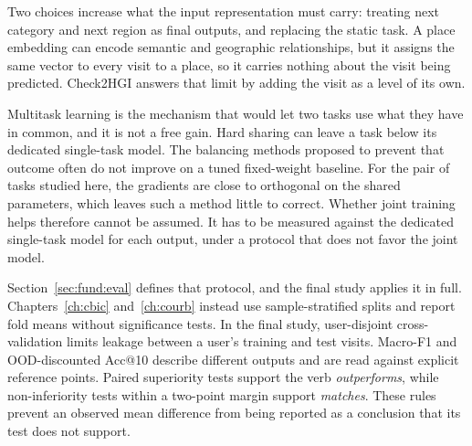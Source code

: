 Two choices increase what the input representation must carry: treating next category
and next region as final outputs, and replacing the static task. A place embedding
can encode semantic and geographic relationships, but it assigns the same vector to
every visit to a place, so it carries nothing about the visit being predicted.
Check2HGI answers that limit by adding the visit as a level of its own.

Multitask learning is the mechanism that would let two tasks use what they have in
common, and it is not a free gain. Hard sharing can leave a task below its dedicated
single-task model. The balancing methods proposed to prevent that outcome often do not
improve on a tuned fixed-weight baseline. For the pair of tasks studied here, the
gradients are close to orthogonal on the shared parameters, which leaves such a method
little to correct. Whether joint training helps therefore cannot be assumed. It has to be
measured against the dedicated single-task model for each output, under a protocol
that does not favor the joint model.

Section~\ref{sec:fund:eval} defines that protocol, and the final study applies it in
full. Chapters~\ref{ch:cbic} and~\ref{ch:courb} instead use sample-stratified splits
and report fold means without significance tests. In the final study, user-disjoint
cross-validation limits leakage between a user's training and test visits. Macro-F1 and OOD-discounted
Acc@10 describe different outputs and are read against explicit reference points.
Paired superiority tests support the verb \emph{outperforms}, while non-inferiority
tests within a two-point margin support \emph{matches}. These rules prevent an
observed mean difference from being reported as a conclusion that its test does not
support.

